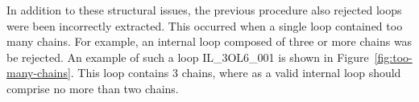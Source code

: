 
In addition to these structural issues, the previous procedure also rejected
loops were been incorrectly extracted. This occurred when a single loop
contained too many chains. For example, an internal loop composed of three or more
chains was be rejected. An example of such a loop IL\_3OL6\_001 is shown in
Figure~\ref{fig:too-many-chains}. This loop contains 3 chains, where as a 
valid internal loop should comprise no more than two chains.

